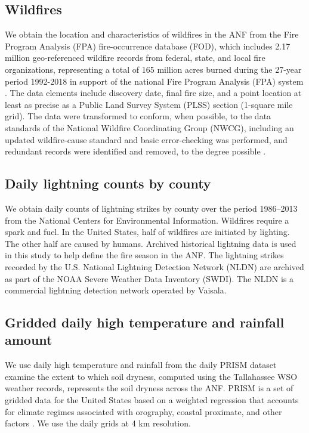 \documentclass[12pt]{iopart}
\begin{document}
\subsection{Wildfires}

We obtain the location and characteristics of wildfires in the ANF from the Fire Program Analysis (FPA) fire-occurrence database (FOD), which includes 2.17 million geo-referenced wildfire records from federal, state, and local fire organizations, representing a total of 165 million acres burned during the 27-year period 1992-2018 in support of the national Fire Program Analysis (FPA) system \citep{Short2020}. The data elements include discovery date, final fire size, and a point location at least as precise as a Public Land Survey System (PLSS) section (1-square mile grid). The data were transformed to conform, when possible, to the data standards of the National Wildfire Coordinating Group (NWCG), including an updated wildfire-cause standard and basic error-checking was performed, and redundant records were identified and removed, to the degree possible \citep{Short2020}. 

\subsection{Daily lightning counts by county}

We obtain daily counts of lightning strikes by county over the period 1986--2013 from the National Centers for Environmental Information. Wildfires require a spark and fuel. In the United States, half of wildfires are initiated by lighting. The other half are caused by humans. Archived historical lightning data is used in this study to help define the fire season in the ANF.  The lightning strikes recorded by the U.S. National Lightning Detection Network (NLDN) are archived as part of the NOAA Severe Weather Data Inventory (SWDI). The NLDN is a commercial lightning detection network operated by Vaisala. 

\subsection{Gridded daily high temperature and rainfall amount} 

We use daily high temperature and rainfall from the daily PRISM dataset examine the extent to which soil dryness, computed using the Tallahassee WSO weather records, represents the soil dryness across the ANF. PRISM is a set of gridded data for the United States based on a weighted regression that accounts for climate regimes associated with orography, coastal proximate, and other factors \citep{Daly2013}. We use the daily grids at 4 km resolution.
\end{document}
